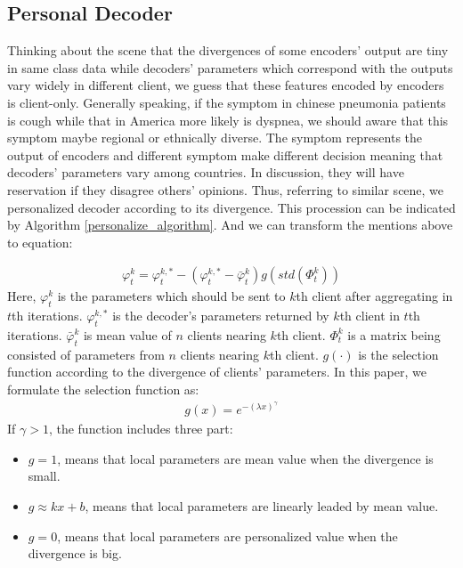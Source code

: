 \documentclass[journal]{IEEEtran}
\begin{document}
\subsection{Personal Decoder}
Thinking about the scene that the divergences of some encoders' output are tiny in same class data while decoders' parameters which correspond with the outputs vary widely in different client, we guess that these features encoded by encoders is client-only. Generally speaking, if the symptom in chinese pneumonia patients is cough while that in America more likely is dyspnea, we should aware that this symptom maybe regional or ethnically diverse. The symptom represents the output of encoders and different symptom make different decision meaning that decoders' parameters vary among countries. In discussion, they will have reservation if they disagree others' opinions. Thus, referring to similar scene, we personalized decoder according to its divergence. This procession can be indicated by Algorithm \ref{personalize_algorithm}. And we can transform the mentions above to equation:

\begin{align}\label{divergence_aggregate}
	\varphi^{k}_{t}=\varphi^{k,*}_{t}-(\varphi^{k,*}_{t}-\bar{\varphi}^{k}_{t})g(std(\Phi^{k}_{t})) 
\end{align}
 Here, $\varphi^{k}_{t}$ is the parameters which should be sent to $k$th client after aggregating in $t$th iterations. $\varphi^{k,*}_{t}$ is the decoder's parameters returned by $k$th client in $t$th iterations. $\bar{\varphi}^{k}_{t}$ is  mean value of $n$ clients nearing $k$th client. $\Phi^{k}_{t}$ is a matrix being consisted of parameters from $n$ clients nearing $k$th client. $g(\cdot)$ is the selection function according to the divergence of clients' parameters. In this paper, we formulate the selection function as:
\begin{align}\label{personal_select}
	g(x)=e^{-(\lambda x)^{\gamma}} 
\end{align}
If $\gamma>1$, the function includes three part:
\begin{itemize}
	\item $g=1$, means that local parameters are mean value when the divergence is small.
	\item $g\approx kx+b$, means that local parameters are linearly leaded by mean value.
	\item $g=0$, means that local parameters are personalized value when the divergence is big.
\end{itemize}
\end{document}
